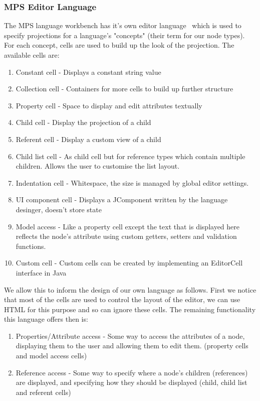 \documentclass{article}
\begin{document}
{\subsubsection{MPS Editor Language}
The MPS language workbench has it's own editor language~\cite{mpsEditorLanguage} which is used to specify projections for a language's "concepts" (their term for our node types). For each concept, cells are used to build up the look of the projection. The available cells are:
\begin{enumerate}
\item Constant cell - Displays a constant string value
\item Collection cell - Containers for more cells to build up further structure
\item Property cell - Space to display and edit attributes textually
\item Child cell - Display the projection of a child
\item Referent cell - Display a custom view of a child
\item Child list cell - As child cell but for reference types which contain multiple children. Allows the user to customise the list layout.
\item Indentation cell - Whitespace, the size is managed by global editor settings.
\item UI component cell - Displays a JComponent written by the language desinger, doesn't store state
\item Model access - Like a property cell except the text that is displayed here reflects the node's attribute using custom getters, setters and validation functions.
\item Custom cell - Custom cells can be created by implementing an EditorCell interface in Java
\end{enumerate}
%
We allow this to inform the design of our own language as follows. First we notice that most of the cells are used to control the layout of the editor, we can use HTML for this purpose and so can ignore these cells. The remaining functionality this language offers then is:
\begin{enumerate}
\item Properties/Attribute access - Some way to access the attributes of a node, displaying them to the user and allowing them to edit them.  (property cells and model access cells)
\item Reference access - Some way to specify where a node's children (references) are displayed, and specifying how they should be displayed (child, child list and referent cells)

\end{enumerate}}
\end{document}

